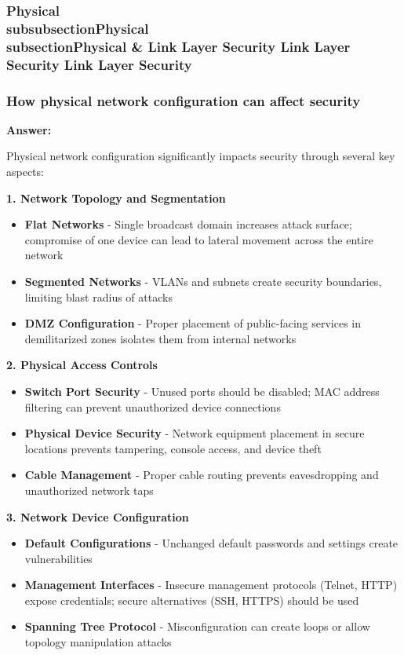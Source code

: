 \documentclass[12pt,a4paper]{article}
\begin{document}
\subsubsection{Physical \\subsubsection{Physical \\subsection{Physical \& Link Layer Security} Link Layer Security} Link Layer Security}

\subsubsection{How physical network configuration can affect security}

\textbf{Answer:}

Physical network configuration significantly impacts security through several key aspects:

\textbf{1. Network Topology and Segmentation}
\begin{itemize}
    \item \textbf{Flat Networks} - Single broadcast domain increases attack surface; compromise of one device can lead to lateral movement across the entire network
    \item \textbf{Segmented Networks} - VLANs and subnets create security boundaries, limiting blast radius of attacks
    \item \textbf{DMZ Configuration} - Proper placement of public-facing services in demilitarized zones isolates them from internal networks
\end{itemize}

\textbf{2. Physical Access Controls}
\begin{itemize}
    \item \textbf{Switch Port Security} - Unused ports should be disabled; MAC address filtering can prevent unauthorized device connections
    \item \textbf{Physical Device Security} - Network equipment placement in secure locations prevents tampering, console access, and device theft
    \item \textbf{Cable Management} - Proper cable routing prevents eavesdropping and unauthorized network taps
\end{itemize}

\textbf{3. Network Device Configuration}
\begin{itemize}
    \item \textbf{Default Configurations} - Unchanged default passwords and settings create vulnerabilities
    \item \textbf{Management Interfaces} - Insecure management protocols (Telnet, HTTP) expose credentials; secure alternatives (SSH, HTTPS) should be used
    \item \textbf{Spanning Tree Protocol} - Misconfiguration can create loops or allow topology manipulation attacks
\end{itemize}
\end{document}
